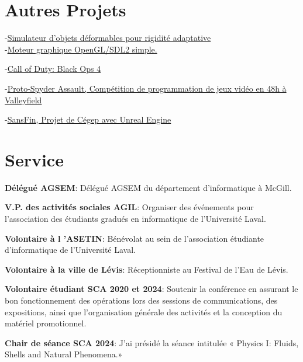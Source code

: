 \documentclass[10pt]{article} %
\begin{document}

\section{Autres Projets}

{
-\href{https://github.com/AlexandreMercierAubin/AdaptiveRigidification2022}{Simulateur d'objets déformables pour rigidité adaptative}\\
-\href{https://github.com/AlexandreMercierAubin/ComputerGraphics}{Moteur graphique OpenGL/SDL2 simple.}\\

}

{
-\href{https://www.callofduty.com/ca/en/blackops4}{Call of Duty: Black Ops 4}

-\href{https://youtu.be/qJjy8b0kuSY}{Proto-Spyder Assault, Compétition de programmation de jeux vidéo en 48h à Valleyfield}

-\href{https://youtu.be/s6vr07Nt1IY}{SansFin, Projet de Cégep avec Unreal Engine}
}

\section{Service}
\textbf{Délégué AGSEM}: Délégué AGSEM du département d'informatique à McGill.

\noindent\textbf{V.P. des activités sociales AGIL}: Organiser des événements pour l'association des étudiants gradués en informatique de l'Université Laval.

\noindent\textbf{Volontaire à l 'ASETIN}: Bénévolat au sein de l'association étudiante d'informatique de l'Université Laval.

\noindent\textbf{Volontaire à la ville de Lévis}: Réceptionniste au Festival de l'Eau de Lévis.

\noindent\textbf{Volontaire étudiant SCA 2020 et 2024}: Soutenir la conférence en assurant le bon fonctionnement des opérations lors des
sessions de communications, des expositions, ainsi que l'organisation générale des activités et la conception du matériel promotionnel.

\noindent\textbf{Chair de séance SCA 2024}: J'ai présidé la séance intitulée « Physics I: Fluids, Shells and Natural Phenomena.»
\end{document}
